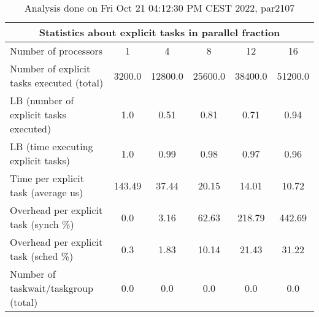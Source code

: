 \begin{table}[h]
\begin{center}
\begin{tabular}{|l|c|c|c|c|c|}
\hline
\multicolumn{6}{|c|}{Statistics about explicit tasks in parallel fraction} \\
\hline
\hline
Number of processors & 1 & 4 & 8 & 12 & 16 \\
\hline
\hline
Number of explicit tasks executed (total)        &          3200.0 &         12800.0 &         25600.0 &         38400.0 &         51200.0 \\
\hline
LB (number of explicit tasks executed)           &             1.0 &            0.51 &            0.81 &            0.71 &            0.94 \\
\hline
LB (time executing explicit tasks)               &             1.0 &            0.99 &            0.98 &            0.97 &            0.96 \\
\hline
Time per explicit task (average us)                 &          143.49 &           37.44 &           20.15 &           14.01 &           10.72 \\
\hline
Overhead per explicit task (synch \%)             &             0.0 &            3.16 &           62.63 &          218.79 &          442.69 \\
\hline
Overhead per explicit task (sched \%)             &             0.3 &            1.83 &           10.14 &           21.43 &           31.22 \\
\hline
Number of taskwait/taskgroup (total)             &             0.0 &             0.0 &             0.0 &             0.0 &             0.0 \\
\hline
\end{tabular}
\end{center}
\caption{ Analysis done on Fri Oct 21 04:12:30 PM CEST 2022, par2107}
\end{table}
